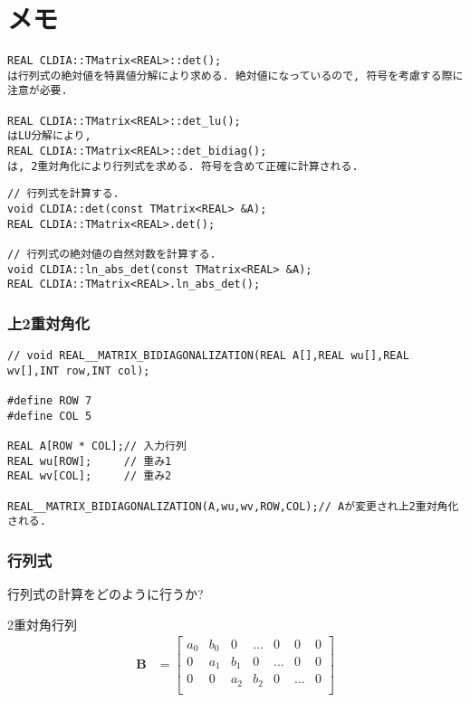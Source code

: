 \documentclass[a4j]{jsarticle}
\begin{document}
\section{メモ}
\begin{lstlisting}[caption=行列式メモ(現在の関数定義),label=ほげ]
REAL CLDIA::TMatrix<REAL>::det(); 
は行列式の絶対値を特異値分解により求める. 絶対値になっているので, 符号を考慮する際に注意が必要. 

REAL CLDIA::TMatrix<REAL>::det_lu(); 
はLU分解により, 
REAL CLDIA::TMatrix<REAL>::det_bidiag(); 
は, 2重対角化により行列式を求める. 符号を含めて正確に計算される. 
\end{lstlisting}

\begin{lstlisting}[caption=行列式メモ(最終的に目指す関数定義),label=ほげ]
// 行列式を計算する. 
void CLDIA::det(const TMatrix<REAL> &A);
REAL CLDIA::TMatrix<REAL>.det();

// 行列式の絶対値の自然対数を計算する. 
void CLDIA::ln_abs_det(const TMatrix<REAL> &A);
REAL CLDIA::TMatrix<REAL>.ln_abs_det();
\end{lstlisting}

\subsubsection{上2重対角化}
\begin{lstlisting}[caption=上2重対角化,label=ほげ]
// void REAL__MATRIX_BIDIAGONALIZATION(REAL A[],REAL wu[],REAL wv[],INT row,INT col);

#define ROW 7
#define COL 5

REAL A[ROW * COL];// 入力行列
REAL wu[ROW];     // 重み1
REAL wv[COL];     // 重み2

REAL__MATRIX_BIDIAGONALIZATION(A,wu,wv,ROW,COL);// Aが変更され上2重対角化される. 

\end{lstlisting}

\subsubsection{行列式}
行列式の計算をどのように行うか?

2重対角行列
\begin{align}
\bm{B}&=
\begin{bmatrix}
a_{0}&b_{0}&0&\ldots &0&0&0\\
0&a_{1}&b_{1}&0&\ldots &0&0\\
0&0&a_{2}&b_{2}&0&\ldots &0\\
\end{bmatrix}
\end{align}
\end{document}

